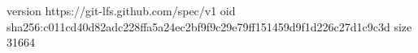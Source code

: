 version https://git-lfs.github.com/spec/v1
oid sha256:c011cd40d82adc228ffa5a24ec2bf9f9c29e79ff151459d9f1d226c27d1c9c3d
size 31664
